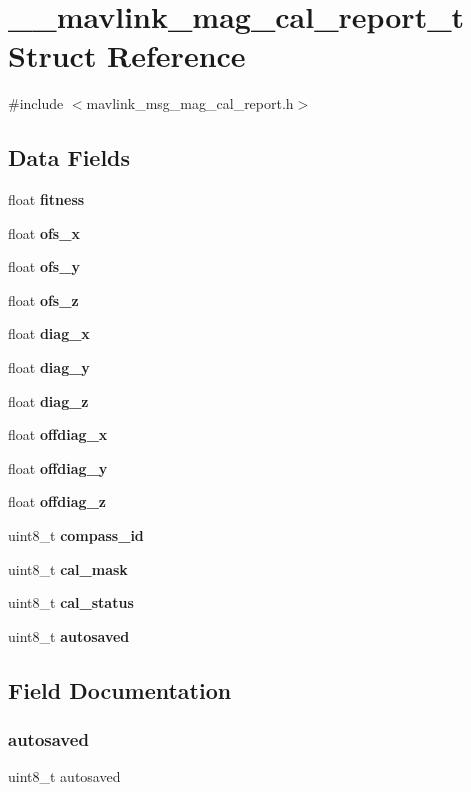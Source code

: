 \section{\+\_\+\+\_\+mavlink\+\_\+mag\+\_\+cal\+\_\+report\+\_\+t Struct Reference}
\label{struct____mavlink__mag__cal__report__t}


{\ttfamily \#include $<$mavlink\+\_\+msg\+\_\+mag\+\_\+cal\+\_\+report.\+h$>$}

\subsection*{Data Fields}
\begin{DoxyCompactItemize}
\item 
float \textbf{ fitness}
\item 
float \textbf{ ofs\+\_\+x}
\item 
float \textbf{ ofs\+\_\+y}
\item 
float \textbf{ ofs\+\_\+z}
\item 
float \textbf{ diag\+\_\+x}
\item 
float \textbf{ diag\+\_\+y}
\item 
float \textbf{ diag\+\_\+z}
\item 
float \textbf{ offdiag\+\_\+x}
\item 
float \textbf{ offdiag\+\_\+y}
\item 
float \textbf{ offdiag\+\_\+z}
\item 
uint8\+\_\+t \textbf{ compass\+\_\+id}
\item 
uint8\+\_\+t \textbf{ cal\+\_\+mask}
\item 
uint8\+\_\+t \textbf{ cal\+\_\+status}
\item 
uint8\+\_\+t \textbf{ autosaved}
\end{DoxyCompactItemize}


\subsection{Field Documentation}
\mbox{\label{struct____mavlink__mag__cal__report__t_abe8836ccc3787118044304f4bf11da45}} 
\subsubsection{autosaved}
{\footnotesize\ttfamily uint8\+\_\+t autosaved}

